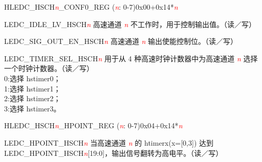 \begin{register}{H}{LEDC\_HSCH\textit{\textcolor{red}{\it{n}}}\_CONF0\_REG (\textit{\textcolor{red}{\it{n}}}: 0-7)}{0x00+0x14*\textit{\textcolor{red}{\it{n}}}}\label{regdesc:LEDCHSCHnCONF0REG}
%
%
%
%
\regnewline%
\begin{regdesc}\begin{reglist}
\item [LEDC\_IDLE\_LV\_HSCH\textcolor{red}{\it{n}}] 高速通道 \textcolor{red}{\it{n}} 不工作时，用于控制输出值。（读／写）
\item [LEDC\_SIG\_OUT\_EN\_HSCH\textcolor{red}{\it{n}}] 高速通道 \textcolor{red}{\it{n}} 输出使能控制位。（读／写）
\item [LEDC\_TIMER\_SEL\_HSCH\textcolor{red}{\it{n}}] 用于从 4 种高速时钟计数器中为高速通道 \textcolor{red}{\it{n}} 选择一个时钟计数器。（读／写）\\
0:选择 hstimer0；\\
1:选择 hstimer1；\\
2:选择 hstimer2；\\
3:选择 hstimer3。
\end{reglist}\end{regdesc}
\end{register}


\begin{register}{H}{LEDC\_HSCH\textit{\textcolor{red}{\it{n}}}\_HPOINT\_REG (\textit{\textcolor{red}{\it{n}}}: 0-7)}{0x04+0x14*\textit{\textcolor{red}{\it{n}}}}\label{regdesc:LEDCHSCHnHPOINTREG}
%
%
\regnewline%
\begin{regdesc}\begin{reglist}
\item [LEDC\_HPOINT\_HSCH\textcolor{red}{\it{n}}]\label{regdesc:LEDCHPOINTHSCHn} 当高速通道 \textcolor{red}{\it{n}} 的 htimerx(x=[0,3]) 达到 LEDC\_HPOINT\_HSCH\textcolor{red}{\it{n}}[19:0]，输出信号翻转为高电平。（读／写）
\end{reglist}\end{regdesc}
\end{register}



